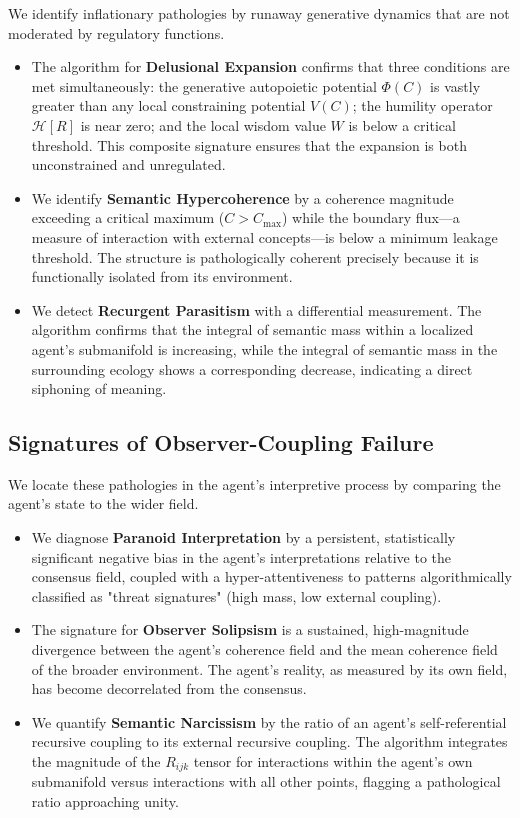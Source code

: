 We identify inflationary pathologies by runaway generative dynamics that are not moderated by regulatory functions.
\begin{itemize}
    \item The algorithm for \textbf{Delusional Expansion} confirms that three conditions are met simultaneously: the generative autopoietic potential \(\Phi(C)\) is vastly greater than any local constraining potential \(V(C)\); the humility operator \(\mathcal{H}[R]\) is near zero; and the local wisdom value \(W\) is below a critical threshold. This composite signature ensures that the expansion is both unconstrained and unregulated.
    \item We identify \textbf{Semantic Hypercoherence} by a coherence magnitude exceeding a critical maximum (\(C > C_{\text{max}}\)) while the boundary flux—a measure of interaction with external concepts—is below a minimum leakage threshold. The structure is pathologically coherent precisely because it is functionally isolated from its environment.
    \item We detect \textbf{Recurgent Parasitism} with a differential measurement. The algorithm confirms that the integral of semantic mass within a localized agent's submanifold is increasing, while the integral of semantic mass in the surrounding ecology shows a corresponding decrease, indicating a direct siphoning of meaning.
\end{itemize}


\subsection{Signatures of Observer-Coupling Failure}
\label{sec:signatures_of_observer_coupling_failure}

We locate these pathologies in the agent's interpretive process by comparing the agent's state to the wider field.
\begin{itemize}
    \item We diagnose \textbf{Paranoid Interpretation} by a persistent, statistically significant negative bias in the agent's interpretations relative to the consensus field, coupled with a hyper-attentiveness to patterns algorithmically classified as "threat signatures" (high mass, low external coupling).
    \item The signature for \textbf{Observer Solipsism} is a sustained, high-magnitude divergence between the agent's coherence field and the mean coherence field of the broader environment. The agent's reality, as measured by its own field, has become decorrelated from the consensus.
    \item We quantify \textbf{Semantic Narcissism} by the ratio of an agent's self-referential recursive coupling to its external recursive coupling. The algorithm integrates the magnitude of the \(R_{ijk}\) tensor for interactions within the agent's own submanifold versus interactions with all other points, flagging a pathological ratio approaching unity.
\end{itemize}

